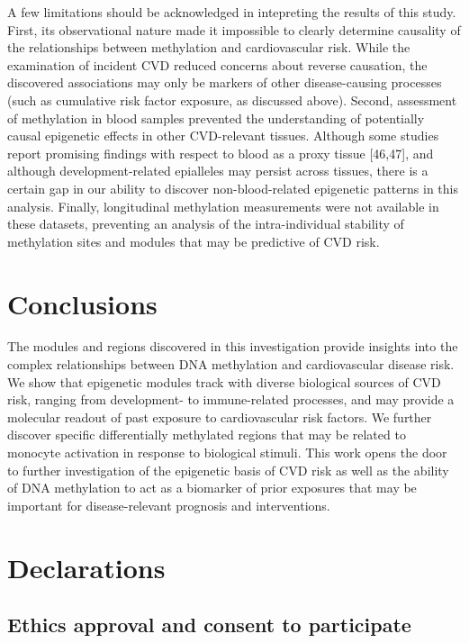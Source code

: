\documentclass[]{bmcart}
\theoremstyle{definition}
\theoremstyle{definition}
\theoremstyle{definition}
\theoremstyle{remark}
\begin{document}
A few limitations should be acknowledged in intepreting the results of
this study. First, its observational nature made it impossible to
clearly determine causality of the relationships between methylation and
cardiovascular risk. While the examination of incident CVD reduced
concerns about reverse causation, the discovered associations may only
be markers of other disease-causing processes (such as cumulative risk
factor exposure, as discussed above). Second, assessment of methylation
in blood samples prevented the understanding of potentially causal
epigenetic effects in other CVD-relevant tissues. Although some studies
report promising findings with respect to blood as a proxy tissue
{[}46,47{]}, and although development-related epialleles may persist
across tissues, there is a certain gap in our ability to discover
non-blood-related epigenetic patterns in this analysis. Finally,
longitudinal methylation measurements were not available in these
datasets, preventing an analysis of the intra-individual stability of
methylation sites and modules that may be predictive of CVD risk.

\section{Conclusions}\label{conclusions}

The modules and regions discovered in this investigation provide
insights into the complex relationships between DNA methylation and
cardiovascular disease risk. We show that epigenetic modules track with
diverse biological sources of CVD risk, ranging from development- to
immune-related processes, and may provide a molecular readout of past
exposure to cardiovascular risk factors. We further discover specific
differentially methylated regions that may be related to monocyte
activation in response to biological stimuli. This work opens the door
to further investigation of the epigenetic basis of CVD risk as well as
the ability of DNA methylation to act as a biomarker of prior exposures
that may be important for disease-relevant prognosis and interventions.

\section{Declarations}\label{declarations}

\subsection{Ethics approval and consent to
participate}\label{ethics-approval-and-consent-to-participate}
\end{document}
